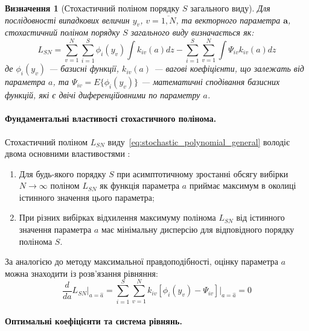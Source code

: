 \documentclass[12pt,a4paper]{article}
\newtheorem{definition}[theorem]{Визначення}
\begin{document}
\begin{definition}[Стохастичний поліном порядку $S$ загального виду]
Для послідовності випадкових величин $y_v$, $v = \overline{1,N}$, та векторного параметра $\mathbf{a}$, стохастичний поліном порядку $S$ загального виду визначається як:
\begin{equation}
\label{eq:stochastic_polynomial_general}
L_{SN} = \sum_{v=1}^{N} \sum_{i=1}^{S} \phi_i(y_v) \int k_{iv}(a) dz - \sum_{i=1}^{S} \sum_{v=1}^{N} \int \Psi_{iv} k_{iv}(a) dz
\end{equation}
де $\phi_i(y_v)$ --- базисні функції, $k_{iv}(a)$ --- вагові коефіцієнти, що залежать від параметра $a$, та $\Psi_{iv} = E\{\phi_i(y_v)\}$ --- математичні сподівання базисних функцій, які є двічі диференційовними по параметру $a$.
\end{definition}

\paragraph{Фундаментальні властивості стохастичного полінома.}

Стохастичний поліном $L_{SN}$ виду~\eqref{eq:stochastic_polynomial_general} володіє двома основними властивостями \cite{kunchenko2002polynomial}:

\begin{enumerate}
\item Для будь-якого порядку $S$ при асимптотичному зростанні обсягу вибірки $N \to \infty$ поліном $L_{SN}$ як функція параметра $a$ приймає максимум в околиці істинного значення цього параметра;

\item При різних вибірках відхилення максимуму полінома $L_{SN}$ від істинного значення параметра $a$ має мінімальну дисперсію для відповідного порядку полінома $S$.
\end{enumerate}

За аналогією до методу максимальної правдоподібності, оцінку параметра $a$ можна знаходити із розв'язання рівняння:
\begin{equation}
\label{eq:pmm_estimation_eq}
\frac{d}{da} L_{SN} \bigg|_{a=\hat{a}} = \sum_{i=1}^{S} \sum_{v=1}^{N} k_{iv} [\phi_i(y_v) - \Psi_{iv}] \bigg|_{a=\hat{a}} = 0
\end{equation}

\paragraph{Оптимальні коефіцієнти та система рівнянь.}
\end{document}
